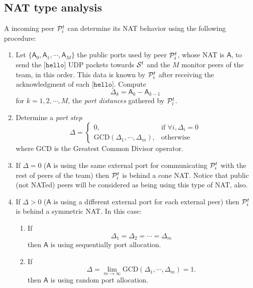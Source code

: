 \subsection{NAT type analysis}
A incoming peer ${\cal P}^t_i$ can determine its NAT behavior using
the following procedure:
\begin{enumerate}
\item Let $\{\mathsf{A}_0, \mathsf{A}_1, \cdots, \mathsf{A}_M\}$ the
  public ports used by peer ${\cal P}^t_i$, whose NAT is $\mathsf{A}$,
  to send the [$\mathtt{hello}$] UDP packets towards ${\cal S}^t$ and
  the $M$ monitor peers of the team, in this order. This data is known
  by ${\cal P}^t_i$ after receiving the acknowledgment of each
  [$\mathtt{hello}$]. Compute
  \begin{equation}
    \Delta_k = \mathsf{A}_k - \mathsf{A}_{k-1}
    \label{eq:port_distancies}
  \end{equation}
  for $k=1,2,\cdots,M$, the \emph{port distances} gathered by ${\cal
    P}^t_i$.
\item Determine a \emph{port step}
  \begin{equation}
    \Delta = \left\{\begin{array}{lr}
    0, & \text{if } \forall i, \Delta_i = 0 \\
    \mathrm{GCD}(\Delta_1, \cdots, \Delta_m), & \text{otherwise}
    \end{array}\right.
    \label{eq:port_step}
  \end{equation}
  where GCD is the Greatest Common Divisor operator.
\item If $\Delta=0$ ($\mathsf{A}$ is using the same external port for
  communicating ${\cal P}^t_i$ with the rest of peers of the team)
  then ${\cal P}^t_i$ is behind a cone NAT. Notice that public (not
  NATed) peers will be considered as being using this type of NAT,
  also.
\item If $\Delta>0$ ($\mathsf{A}$ is using a different external port
  for each external peer) then ${\cal P}^t_i$ is behind a symmetric
  NAT. In this case:
  \begin{enumerate}
  \item If
    \begin{equation}
      \Delta_1 = \Delta_2 = \cdots = \Delta_m
    \end{equation}
    then $\mathsf{A}$ is using sequentially port allocation.
  \item If
    \begin{equation}
      \Delta = \lim_{m\to\infty} \mathrm{GCD}(\Delta_1, \cdots, \Delta_m) = 1.
    \end{equation}
    then $\mathsf{A}$ is using random port allocation.
  \end{enumerate}
\end{enumerate}

